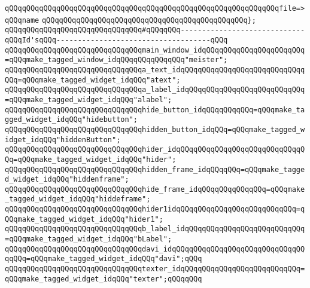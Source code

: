 \verb|qQQqqQQqqQQqqQQqqQQqqQQqqQQqqQQqqQQqqQQqqQQqqQQqqQQqqQQqqQQqqQQqfile=>qQQqname|\newline
\verb|qQQqqQQqqQQqqQQqqQQqqQQqqQQqqQQqqQQqqQQqqQQqqQQq};|\newline
\newline
\newline
\verb|qQQqqQQqqQQqqQQqqQQqqQQqqQQqqQQq#qQQqqQQq-----------------------------qQQqId'sqQQq------------------------------------qQQq|\newline
\newline
\verb|qQQqqQQqqQQqqQQqqQQqqQQqqQQqqQQqmain_window_idqQQqqQQqqQQqqQQqqQQqqQQq=qQQqmake_tagged_window_idqQQqqQQqqQQqqQQq"meister";|\newline
\verb|qQQqqQQqqQQqqQQqqQQqqQQqqQQqqQQqa_text_idqQQqqQQqqQQqqQQqqQQqqQQqqQQqqQQq=qQQqmake_tagged_widget_idqQQq"atext";|\newline
\verb|qQQqqQQqqQQqqQQqqQQqqQQqqQQqqQQqa_label_idqQQqqQQqqQQqqQQqqQQqqQQqqQQq=qQQqmake_tagged_widget_idqQQq"alabel";|\newline
\verb|qQQqqQQqqQQqqQQqqQQqqQQqqQQqqQQqhide_button_idqQQqqQQqqQQq=qQQqmake_tagged_widget_idqQQq"hidebutton";|\newline
\verb|qQQqqQQqqQQqqQQqqQQqqQQqqQQqqQQqhidden_button_idqQQq=qQQqmake_tagged_widget_idqQQq"hiddenButton";|\newline
\verb|qQQqqQQqqQQqqQQqqQQqqQQqqQQqqQQqhider_idqQQqqQQqqQQqqQQqqQQqqQQqqQQqqQQq=qQQqmake_tagged_widget_idqQQq"hider";|\newline
\newline
\verb|qQQqqQQqqQQqqQQqqQQqqQQqqQQqqQQqhidden_frame_idqQQqqQQq=qQQqmake_tagged_widget_idqQQq"hiddenframe";|\newline
\verb|qQQqqQQqqQQqqQQqqQQqqQQqqQQqqQQqhide_frame_idqQQqqQQqqQQqqQQq=qQQqmake_tagged_widget_idqQQq"hiddeframe";|\newline
\verb|qQQqqQQqqQQqqQQqqQQqqQQqqQQqqQQqhider1idqQQqqQQqqQQqqQQqqQQqqQQqqQQq=qQQqmake_tagged_widget_idqQQq"hider1";|\newline
\newline
\verb|qQQqqQQqqQQqqQQqqQQqqQQqqQQqqQQqb_label_idqQQqqQQqqQQqqQQqqQQqqQQqqQQq=qQQqmake_tagged_widget_idqQQq"bLabel";|\newline
\verb|qQQqqQQqqQQqqQQqqQQqqQQqqQQqqQQqdavi_idqQQqqQQqqQQqqQQqqQQqqQQqqQQqqQQqqQQq=qQQqmake_tagged_widget_idqQQq"davi";qQQq|\newline
\verb|qQQqqQQqqQQqqQQqqQQqqQQqqQQqqQQqtexter_idqQQqqQQqqQQqqQQqqQQqqQQqqQQq=qQQqmake_tagged_widget_idqQQq"texter";qQQqqQQq|\newline

